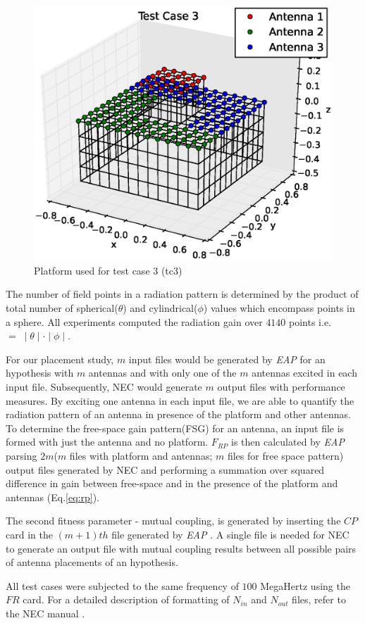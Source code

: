 \documentclass{sig-alternate}
\begin{document}
\begin{figure}
    \begin{center}
        \includegraphics[width=.41\textwidth]{FIG/tc_3_figure}
\end{center}
\caption{Platform used for test case 3 (tc3)}
\label{fig:plat3}
\end{figure}

The number of field points in a radiation pattern is determined by the product of total number of spherical($\theta$) and cylindrical($\phi$) values which encompass points in a sphere. All experiments computed the radiation gain over $4140$ points i.e.$ = \; \mid \theta \mid \cdot \mid \phi \mid$.

For our placement study, $m$ input files would be generated by \textit{EAP} for an hypothesis with $m$ antennas and with only one of the $m$ antennas excited in each input file. Subsequently, NEC would generate $m$ output files with performance measures. By exciting one antenna in each input file, we are able to quantify the radiation pattern of an antenna in presence of the platform and other antennas. To determine the free-space gain pattern(FSG) for an antenna, an input file is formed with just the antenna and no platform. $F_{RP}$ is then calculated by \textit{EAP} parsing $2m$($m$ files with platform and antennas; $m$ files for free space pattern) output files generated by NEC and performing a summation over squared difference in gain between free-space and in the presence of the platform and antennas (Eq.\eqref{eq:rp}).

The second fitness parameter - mutual coupling, is generated by inserting the $CP$ card in the $(m+1)th$ file generated by \textit{EAP} . A single file is needed for NEC to generate an output file with mutual coupling results between all possible pairs of antenna placements of an hypothesis.

All test cases were subjected to the same frequency of $100$ MegaHertz using the $FR$ card. For a detailed description of formatting of $N_{in}$ and $N_{out}$ files, refer to the NEC manual \cite{burke1981numerical}.
\end{document}
